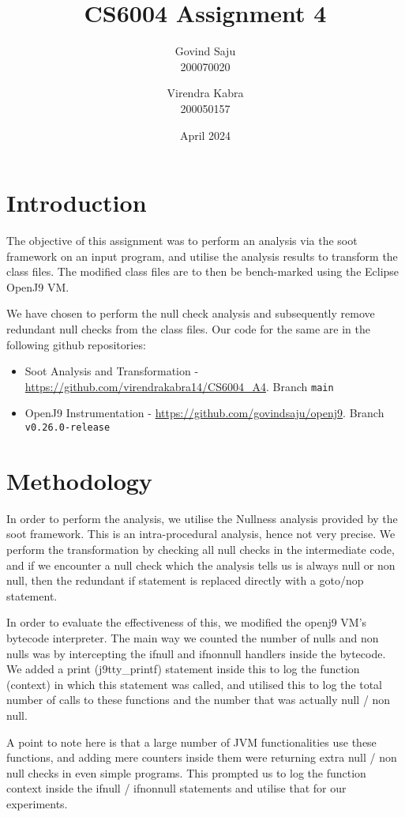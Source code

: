 \documentclass{article}
\title{CS6004 Assignment 4}
\author{Govind Saju \\ 200070020  \and Virendra Kabra \\ 200050157}
\date{April 2024}
\begin{document}
\maketitle

\section{Introduction}
The objective of this assignment was to perform an analysis via the soot framework on an input program, and utilise the analysis results to transform the class files. The modified class files are to then be bench-marked using the Eclipse OpenJ9 VM.

We have chosen to perform the null check analysis and subsequently remove redundant null checks from the class files. Our code for the same are in the following github repositories:
\begin{itemize}
    \item Soot Analysis and Transformation - \url{https://github.com/virendrakabra14/CS6004_A4}. Branch \texttt{main}
    \item OpenJ9 Instrumentation - \url{https://github.com/govindsaju/openj9}. Branch \texttt{v0.26.0-release}
\end{itemize}

\section{Methodology}
In order to perform the analysis, we utilise the Nullness analysis provided by the soot framework. This is an intra-procedural analysis, hence not very precise. We perform the transformation by checking all null checks in the intermediate code, and if we encounter a null check which the analysis tells us is always null or non null, then the redundant if statement is replaced directly with a goto/nop statement. 

In order to evaluate the effectiveness of this, we modified the openj9 VM's bytecode interpreter. The main way we counted the number of nulls and non nulls was by intercepting the ifnull and ifnonnull handlers inside the bytecode. We added a print (j9tty\_printf) statement inside this to log the function (context) in which this statement was called, and utilised this to log the total number of calls to these functions and the number that was actually null / non null.

A point to note here is that a large number of JVM functionalities use these functions, and adding mere counters inside them were returning extra null / non null checks in even simple programs. This prompted us to log the function context inside the ifnull / ifnonnull statements and utilise that for our experiments.
\end{document}

